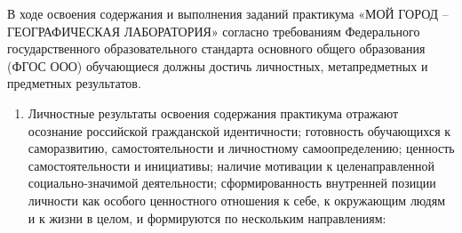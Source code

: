 \documentclass[
  11pt,
]{book}
\providecommand{\tightlist}{%
  \setlength{\itemsep}{0pt}\setlength{\parskip}{0pt}}
\begin{document}
В ходе освоения содержания и выполнения заданий практикума «МОЙ ГОРОД -- ГЕОГРАФИЧЕСКАЯ ЛАБОРАТОРИЯ» согласно требованиям Федерального государственного образовательного стандарта основного общего образования (ФГОС ООО) обучающиеся должны достичь личностных, метапредметных и предметных результатов.

\begin{enumerate}
\def\labelenumi{\arabic{enumi}.}
\tightlist
\item
  Личностные результаты освоения содержания практикума отражают осознание российской гражданской идентичности; готовность обучающихся к саморазвитию, самостоятельности и личностному самоопределению; ценность самостоятельности и инициативы; наличие мотивации к целенаправленной социально-значимой деятельности; сформированность внутренней позиции личности как особого ценностного отношения к себе, к окружающим людям и к жизни в целом, и формируются по нескольким направлениям:
\end{enumerate}
\end{document}
